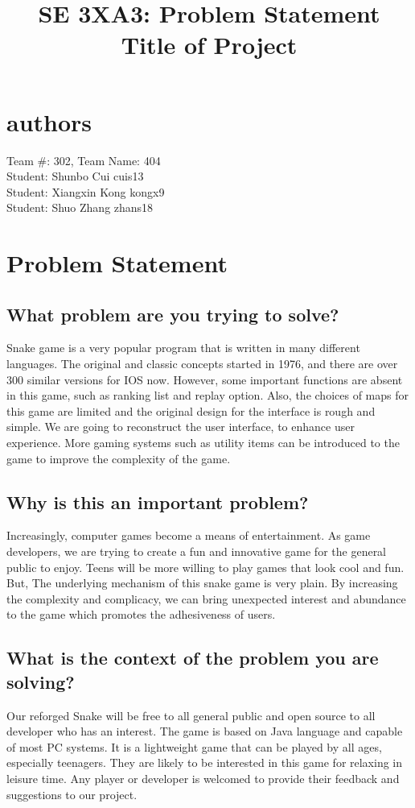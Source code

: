\documentclass[11pt, oneside]{article}   	%
\title{SE 3XA3: Problem Statement\\Title of Project}
\begin{document}
\marginpar{}
\section*{authors}
Team \#: 302, Team Name: 404
		\\ Student: Shunbo Cui	cuis13
		\\ Student: Xiangxin Kong	kongx9
		\\ Student: Shuo Zhang	zhans18
\section*{Problem Statement}
\subsection*{What problem are you trying to solve?}

\newcommand*\apos{\textsc{\char13}}

Snake game is a very popular program that is written in many different languages. The original and classic concepts started in 1976, and there are over 300 similar versions for IOS now. However, some important functions are absent in this game, such as ranking list and replay option. Also, the choices of maps for this game are limited and the original design for the interface is rough and simple. We are going to reconstruct the user interface,  to enhance user experience. More gaming systems such as utility items can be introduced to the game to improve the complexity of the game.

\subsection*{Why is this an important problem?}

Increasingly, computer games become a means of entertainment. As game developers, we are trying to create a fun and innovative game for the general public to enjoy. Teens will be more willing to play games that look cool and fun. But, The underlying mechanism of this snake game is very plain. By increasing the complexity and complicacy, we can bring unexpected interest and abundance to the game which promotes the adhesiveness of users.

\subsection*{What is the context of the problem you are solving?}

Our reforged Snake will be free to all general public and open source to all developer who has an interest. The game is based on Java language and capable of most PC systems. It is a lightweight game that can be played by all ages, especially teenagers. They are likely to be interested in this game for relaxing in leisure time. Any player or developer is welcomed to provide their feedback and suggestions to our project.
\end{document}
